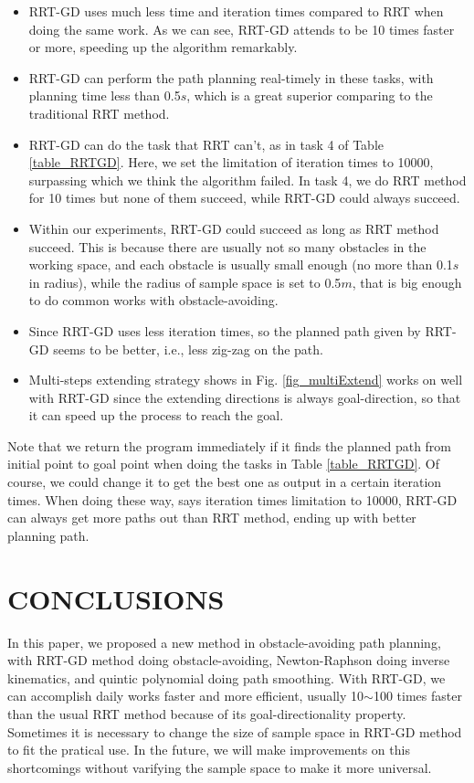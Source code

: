 \documentclass[letterpaper, 10 pt, conference]{ieeeconf}  %
\begin{document}
\begin{itemize}

\item RRT-GD uses much less time and iteration times compared to RRT when doing the same work. As we can see, RRT-GD attends to be 10 times faster or more, speeding up the algorithm remarkably.
\item RRT-GD can perform the path planning real-timely in these tasks, with planning time less than 0.5$s$, which is a great superior comparing to the traditional RRT method.
\item RRT-GD can do the task that RRT can't, as in task 4 of Table \ref{table_RRTGD}. Here, we set the limitation of iteration times to 10000,  surpassing which we think the algorithm failed. In task 4, we do RRT method for 10 times but none of them succeed, while RRT-GD could always succeed.
\item Within our experiments, RRT-GD could succeed as long as RRT method succeed. This is because there are usually not so many obstacles in the working space, and each obstacle is usually small enough (no more than 0.1$s$ in radius), while the radius of sample space is set to 0.5$m$, that is big enough to do common works with obstacle-avoiding.
\item Since RRT-GD uses less iteration times, so the planned path given by RRT-GD seems to be better, i.e., less zig-zag on the path.
\item Multi-steps extending strategy shows in Fig. \ref{fig_multiExtend} works on well with RRT-GD since the extending directions is always goal-direction, so that it can speed up the process to reach the goal.
\end{itemize}

Note that we return the program immediately if it finds the planned path from initial point to goal point when doing the tasks in Table \ref{table_RRTGD}. Of course, we could change it to get the best one as output in a certain iteration times. When doing these way, says iteration times limitation to 10000, RRT-GD can always get more paths out than RRT method, ending up with better planning path.

\section{CONCLUSIONS}

In this paper, we proposed a new method in obstacle-avoiding path planning, with RRT-GD method doing obstacle-avoiding, Newton-Raphson doing inverse kinematics, and quintic polynomial doing path smoothing. With RRT-GD, we can accomplish daily works faster and more efficient, usually 10$\sim$100 times faster than the usual RRT method because of its goal-directionality property. Sometimes it is necessary to change the size of sample space in RRT-GD method to fit the pratical use. In the future, we will make improvements on this shortcomings without varifying the sample space to make it more universal.
\end{document}
